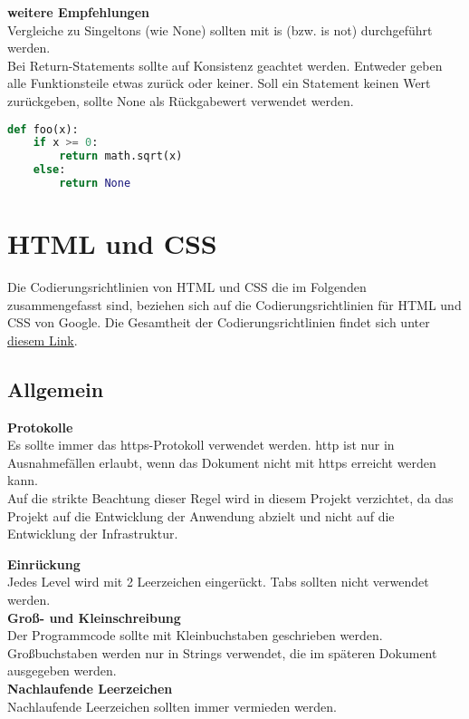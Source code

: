 \textbf{weitere Empfehlungen}\\
Vergleiche zu Singeltons (wie None) sollten mit is (bzw. is not) durchgeführt werden.\\
Bei Return-Statements sollte auf Konsistenz geachtet werden. Entweder geben alle Funktionsteile etwas zurück oder keiner. Soll ein Statement keinen Wert zurückgeben, sollte None als Rückgabewert verwendet werden.
\begin{lstlisting}[language = Python, caption = konsistente return-Statements, label = lst:return-Statements]
def foo(x):
	if x >= 0:
		return math.sqrt(x)
	else:
		return None
\end{lstlisting}

\section{HTML und CSS}
Die Codierungsrichtlinien von HTML und CSS die im Folgenden zusammengefasst sind, beziehen sich auf die Codierungsrichtlinien für HTML und CSS von Google. Die Gesamtheit der Codierungsrichtlinien findet sich unter \href{https://google.github.io/styleguide/htmlcssguide.html}{diesem Link}.

\subsection{Allgemein}
\textbf{Protokolle}\\
Es sollte immer das https-Protokoll verwendet werden. http ist nur in Ausnahmefällen erlaubt, wenn das Dokument nicht mit https erreicht werden kann.\\
Auf die strikte Beachtung dieser Regel wird in diesem Projekt verzichtet, da das Projekt auf die Entwicklung der Anwendung abzielt und nicht auf die Entwicklung der Infrastruktur.

\textbf{Einrückung}\\
Jedes Level wird mit 2 Leerzeichen eingerückt. Tabs sollten nicht verwendet werden.\\

\textbf{Groß- und Kleinschreibung}\\
Der Programmcode sollte mit Kleinbuchstaben geschrieben werden. Großbuchstaben werden nur in Strings verwendet, die im späteren Dokument ausgegeben werden.\\

\textbf{Nachlaufende Leerzeichen}\\
Nachlaufende Leerzeichen sollten immer vermieden werden.\\

